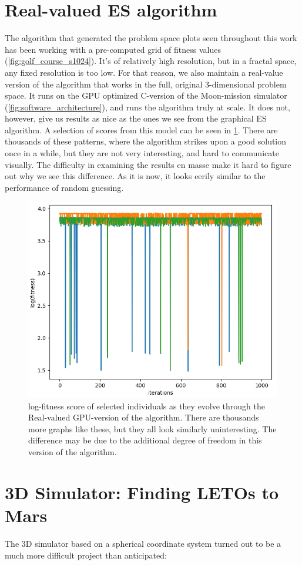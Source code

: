 \section{Real-valued ES algorithm}
The algorithm that generated the problem space plots seen throughout this work has been working with a pre-computed grid of fitness values (\cref{fig:golf_course_s1024}). It's of relatively high resolution, but in a fractal space, any fixed resolution is too low. For that reason, we also maintain a real-value version of the algorithm that works in the full, original 3-dimensional problem space. It runs on the GPU optimized C-version of the Moon-mission simulator (\cref{fig:software_architecture}), and runs the algorithm truly at scale. It does not, however, give us results as nice as the ones we see from the graphical ES algorithm. A selection of scores from this model can be seen in \cref{fig:GPUresults}. There are thousands of these patterns, where the algorithm strikes upon a good solution once in a while, but they are not very interesting, and hard to communicate visually. The difficulty in examining the results en masse make it hard to figure out why we see this difference. As it is now, it looks eerily similar to the performance of random guessing.

\begin{figure}[ht]
    \centering
    \includegraphics[width=0.6\linewidth]{fig/GPUresults.png}
    \caption{log-fitness score of selected individuals as they evolve through the Real-valued GPU-version of the algorithm. There are thousands more graphs like these, but they all look similarly uninteresting. The difference may be due to the additional degree of freedom in this version of the algorithm.}
    \label{fig:GPUresults}
\end{figure}

\clearpage

\section{3D Simulator: Finding LETOs to Mars}
The 3D simulator based on a spherical coordinate system turned out to be a much more difficult project than anticipated:

